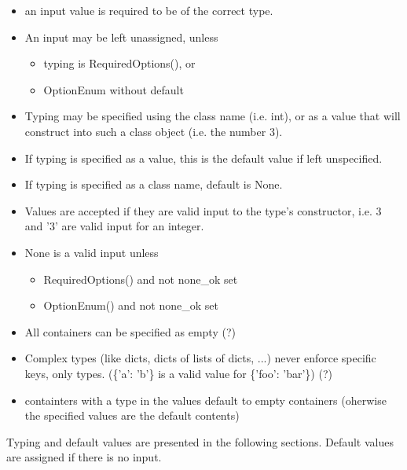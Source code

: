  \begin{itemize}
 \item an input value is required to be of the correct type.

 \item An input may be left unassigned, unless
   \begin{itemize}
   \item typing is RequiredOptions(), or
   \item OptionEnum without default
   \end{itemize}
   
 \item Typing may be specified using the class name (i.e. int), or as
   a value that will construct into such a class object (i.e. the
   number 3).

 \item If typing is specified as a value, this is the default value if
   left unspecified.

 \item If typing is specified as a class name, default is None.

 \item Values are accepted if they are valid input to the type's
   constructor, i.e. 3 and '3' are valid input for an integer.

 \item None is a valid input unless
   \begin{itemize}
   \item RequiredOptions() and not none\_ok set
   \item OptionEnum() and not none\_ok set
   \end{itemize}

 \item All containers can be specified as empty (?)

 \item Complex types (like dicts, dicts of lists of dicts, ...) never
   enforce specific keys, only types. (\{'a': 'b'\} is a valid value
   for \{'foo': 'bar'\}) (?)
   
 \item containters with a type in the values default to empty
   containers (oherwise the specified values are the default contents)

\end{itemize}


Typing and default values are presented in the following sections.
Default values are assigned if there is no input.

